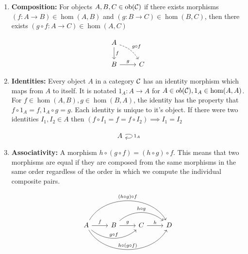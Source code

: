 \documentclass[10pt,a4paper,reqno]{amsart}
\numberwithin{figure}{section}
\begin{document}
\begin{enumerate}
        \item \textbf{Composition:} For objects $A,B,C\in \operatorname{ob}(\mathcal{C})$
        if there exists morphisms $(f: A\to B)\in \hom(A,B)$ and $(g: B\to C)\in
        \hom(B,C)$, then there exists $(g\circ f: A\to C)\in \hom(A,C)$
        \begin{figure}[H]
        \begin{equation}
        \begin{tikzcd}
                A \ar[dr,"g\circ f",bend left=20, dashrightarrow] \ar[d,"f"] \\
                B \ar[r,"g"] & C
        \end{tikzcd}
        \end{equation}
        \caption{}
        \end{figure}
        \item \textbf{Identities:} Every object $A$ in a category $\mathcal{C}$
        has an identity morphism which maps from $A$ to itself.  It is notated
        $1_A: A\to A$ for $A\in ob(\mathcal{C}), 1_A\in \hom(A,A)$.  For $f\in
        \hom(A,B), g\in \hom(B,A)$, the identity has the property that $f\circ
        1_A = f, 1_A\circ g = g$. Each identity is unique to it's object. If
        there were two identities $I_1,I_2\in A$ then $(f\circ I_1 = f = f\circ
        I_2) \implies I_1=I_2$
        \begin{figure}[H]
        \begin{equation}
        \begin{tikzcd}
                A \ar[loop right,"1_A"]
        \end{tikzcd}
        \end{equation}
        \caption{}
        \end{figure}
        \item \textbf{Associativity:} A morphism $h\circ(g\circ f) = (h\circ
        g)\circ f$. This means that two morphisms are equal if they are
        composed from the same morphisms in the same order regardless of the
        order in which we compute the individual composite pairs.
        \begin{figure}[H]
        \begin{equation}
        \begin{tikzcd}
                A \ar[r,"f"] \ar[rr,"g\circ f", bend right=40] \ar[rrr,"h\circ(g\circ f)",bend right=60] \ar[rrr, bend left=60,"(h\circ g)\circ f"]
                & B \ar[r,"g"] \ar[rr,"h\circ g",bend left=40]
                & C \ar[r,"h"] 
                & D
        \end{tikzcd}
        \end{equation}
        \caption{}
        \end{figure}
\end{enumerate}
\end{document}
